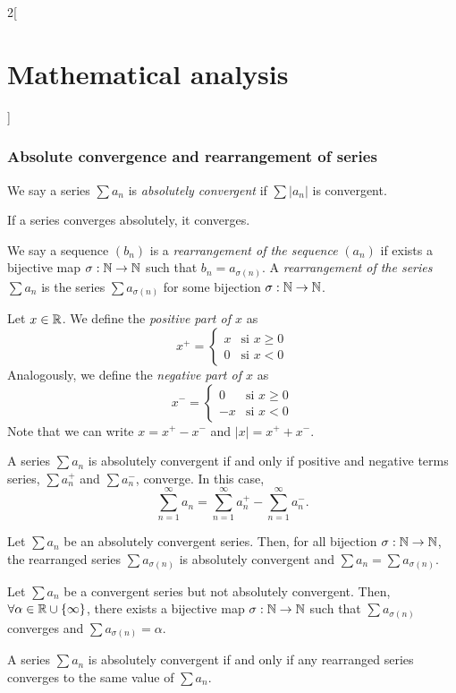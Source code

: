 \documentclass[../../../main.tex]{subfiles}
\begin{document}
\begin{multicols}{2}[\section{Mathematical analysis}]
  \subsubsection{Absolute convergence and rearrangement of series}
  \begin{definition}
    We say a series $\sum a_n$ is \textit{absolutely convergent} if $\sum |a_n|$ is convergent.
  \end{definition}
  \begin{theorem}
    If a series converges absolutely, it converges.
  \end{theorem}
  \begin{definition}
    We say a sequence $(b_n)$ is a \textit{rearrangement of the sequence} $(a_n)$ if exists a bijective map $\sigma:\mathbb{N} \rightarrow\mathbb{N} $ such that $b_n=a_{\sigma(n)}$. A \textit{rearrangement of the series} $\sum a_n$ is the series $\sum a_{\sigma(n)}$ for some bijection $\sigma:\mathbb{N} \rightarrow\mathbb{N} $.
  \end{definition}
  \begin{definition}
    Let $x\in\mathbb{R} $. We define the \textit{positive part of $x$} as $$x^+=
      \begin{cases}
        x & \text{si }x\geq 0 \\
        0 & \text{si }x<0
      \end{cases}$$ Analogously, we define the \textit{negative part of $x$} as $$x^-=
      \begin{cases}
        0  & \text{si }x\geq 0 \\
        -x & \text{si }x<0
      \end{cases}$$ Note that we can write $x=x^+-x^-$ and $|x|=x^++x^-$.
  \end{definition}
  \begin{theorem}
    A series $\sum a_n$ is absolutely convergent if and only if positive and negative terms series, $\sum a_n^+$ and $\sum a_n^-$, converge. In this case, $$\sum_{n=1}^\infty a_n=\sum_{n=1}^\infty a_n^+-\sum_{n=1}^\infty a_n^-.$$
  \end{theorem}
  \begin{theorem}
    Let $\sum a_n$ be an absolutely convergent series. Then, for all bijection $\sigma:\mathbb{N} \rightarrow\mathbb{N} $, the rearranged series $\sum a_{\sigma(n)}$ is absolutely convergent and $\sum a_n=\sum a_{\sigma(n)}$.
  \end{theorem}
  \begin{theorem}
    Let $\sum a_n$ be a convergent series but not absolutely convergent. Then, $\forall\alpha\in\mathbb{R} \cup\{\infty\}$, there exists a bijective map $\sigma:\mathbb{N} \rightarrow\mathbb{N} $ such that $\sum a_{\sigma(n)}$ converges and $\sum a_{\sigma(n)}=\alpha$.
  \end{theorem}
  \begin{theorem}
    A series $\sum a_n$ is absolutely convergent if and only if any rearranged series converges to the same value of $\sum a_n$.
  \end{theorem}

\end{multicols}
\end{document}

